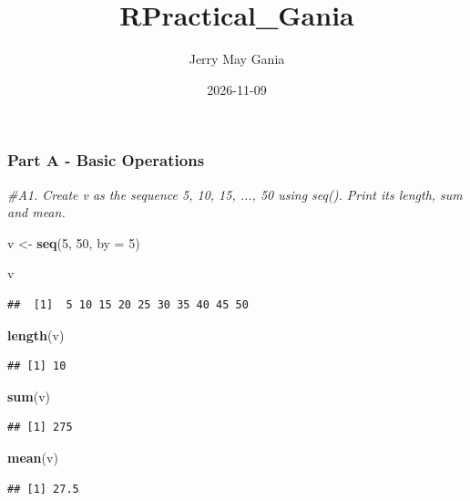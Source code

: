 \documentclass[
]{article}
\title{RPractical\_Gania}
\author{Jerry May Gania}
\date{2026-11-09}
\newenvironment{Shaded}{\begin{snugshade}}{\end{snugshade}}
\newcommand{\AttributeTok}[1]{\textcolor[rgb]{0.13,0.29,0.53}{#1}}
\newcommand{\CommentTok}[1]{\textcolor[rgb]{0.56,0.35,0.01}{\textit{#1}}}
\newcommand{\DecValTok}[1]{\textcolor[rgb]{0.00,0.00,0.81}{#1}}
\newcommand{\FunctionTok}[1]{\textcolor[rgb]{0.13,0.29,0.53}{\textbf{#1}}}
\newcommand{\NormalTok}[1]{#1}
\newcommand{\OtherTok}[1]{\textcolor[rgb]{0.56,0.35,0.01}{#1}}
\begin{document}
\maketitle

\subsubsection{Part A - Basic
Operations}\label{part-a---basic-operations}

\begin{Shaded}
\begin{Highlighting}[]
\CommentTok{\#A1. Create v as the sequence 5, 10, 15, ..., 50 using seq(). Print its length, sum and mean.}

\NormalTok{v }\OtherTok{\textless{}{-}} \FunctionTok{seq}\NormalTok{(}\DecValTok{5}\NormalTok{, }\DecValTok{50}\NormalTok{, }\AttributeTok{by =} \DecValTok{5}\NormalTok{)}

\NormalTok{v}
\end{Highlighting}
\end{Shaded}

\begin{verbatim}
##  [1]  5 10 15 20 25 30 35 40 45 50
\end{verbatim}

\begin{Shaded}
\begin{Highlighting}[]
\FunctionTok{length}\NormalTok{(v)}
\end{Highlighting}
\end{Shaded}

\begin{verbatim}
## [1] 10
\end{verbatim}

\begin{Shaded}
\begin{Highlighting}[]
\FunctionTok{sum}\NormalTok{(v)}
\end{Highlighting}
\end{Shaded}

\begin{verbatim}
## [1] 275
\end{verbatim}

\begin{Shaded}
\begin{Highlighting}[]
\FunctionTok{mean}\NormalTok{(v)}
\end{Highlighting}
\end{Shaded}

\begin{verbatim}
## [1] 27.5
\end{verbatim}
\end{document}
